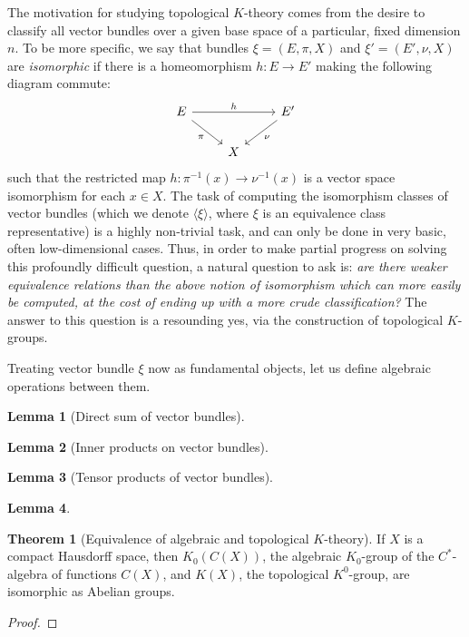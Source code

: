 \documentclass[aps,pra,showpacs,notitlepage,onecolumn,superscriptaddress,nofootinbib]{revtex4-1}
\theoremstyle{definition}
\newtheorem{lemma}{Lemma}[section]
\newtheorem{theorem}{Theorem}[section]
\begin{document}
\noindent The motivation for studying topological $K$-theory comes from the desire to classify all vector bundles over a given base space of a particular, fixed dimension $n$.
To be more specific, we say that bundles $\xi = (E, \pi, X)$ and $\xi' = (E', \nu, X)$ are \emph{isomorphic} if there is a homeomorphism $h : E \rightarrow E'$ making the following diagram commute:
\[\begin{tikzcd}
E && {E'} \\
& X
\arrow["h", from=1-1, to=1-3]
\arrow["\nu", from=1-3, to=2-2]
\arrow["\pi"', from=1-1, to=2-2]
\end{tikzcd}\]
such that the restricted map $h : \pi^{-1}(x) \rightarrow \nu^{-1}(x)$ is a vector space isomorphism for each $x \in X$. The task of computing the isomorphism classes
of vector bundles (which we denote $\langle \xi \rangle$, where $\xi$ is an equivalence class representative) is a highly non-trivial task, and can only be done in very basic, often low-dimensional cases.
Thus, in order to make partial progress on solving this profoundly difficult question, a natural question to ask is: \emph{are there weaker equivalence relations than the above notion of isomorphism which can more easily be computed, at the cost
of ending up with a more crude classification?} The answer to this question is a resounding yes, via the construction of topological $K$-groups.
\newline

\noindent Treating vector bundle $\xi$ now as fundamental objects, let us define algebraic operations between them.

\begin{lemma}[Direct sum of vector bundles]

\end{lemma}

\begin{lemma}[Inner products on vector bundles]
\end{lemma}

\begin{lemma}[Tensor products of vector bundles]
\end{lemma}

\begin{lemma}

\end{lemma}

\begin{theorem}[Equivalence of algebraic and topological $K$-theory]
If $X$ is a compact Hausdorff space, then $K_0(C(X))$, the algebraic $K_0$-group of the $C^{*}$-algebra of functions $C(X)$, and $K(X)$, the topological $K^{0}$-group, are isomorphic as Abelian groups.
\end{theorem}
\begin{proof}

  \end{proof}
\end{document}
